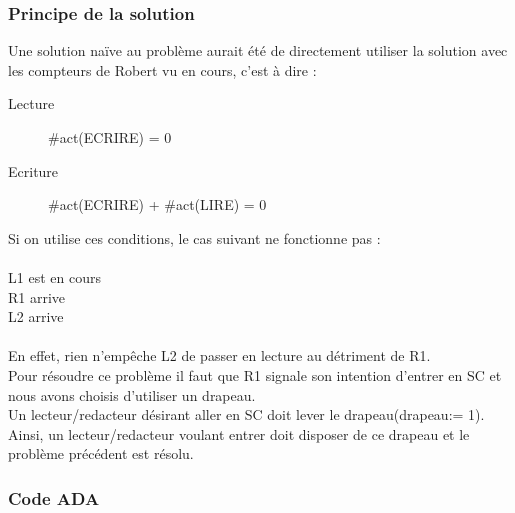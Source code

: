\documentclass[11pt,a4paper]{article}
\begin{document}
\subsubsection{Principe de la solution}
Une solution naïve au problème aurait été de directement utiliser la solution avec les compteurs de Robert vu en cours, c'est à dire : 
\begin{description}
    \item[Lecture] \#act(ECRIRE) = 0
    \item[Ecriture] \#act(ECRIRE) + \#act(LIRE) = 0
\end{description}
Si on utilise ces conditions, le cas suivant ne fonctionne pas :\\~\\
L1 est en cours\\
\indent R1 arrive \\
\indent L2 arrive\\~\\
En effet, rien n’empêche L2 de passer en lecture au détriment de R1.\\
Pour résoudre ce problème il faut que R1 signale son intention d'entrer en SC et nous avons choisis d'utiliser un drapeau.\\
Un lecteur/redacteur désirant aller en SC doit lever le drapeau(drapeau:= 1). Ainsi, un lecteur/redacteur voulant entrer doit disposer de ce drapeau et le problème précédent est résolu.
\subsubsection{Code ADA}
\begin{scriptsize}
    
\end{scriptsize}
\end{document}
